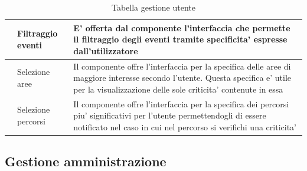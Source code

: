 \documentclass{article}
\begin{document}
\begin{table}[htbp]
\begin{tabularx}{\textwidth}{| l | l | X |}
        \hline
         & Filtraggio eventi & E' offerta dal componente l'interfaccia che permette il filtraggio degli eventi tramite specificita' espresse dall'utilizzatore \\
        \hline
         & Selezione aree & Il componente offre l'interfaccia per la specifica delle aree di maggiore interesse secondo l'utente. Questa specifica e' utile per la visualizzazione delle sole criticita' contenute in essa \\
        \hline
         & Selezione percorsi & Il componente offre l'interfaccia per la specifica dei percorsi piu' significativi per l'utente permettendogli di essere notificato nel caso in cui nel percorso si verifichi una criticita' \\
        \hline
    \end{tabularx}
    \caption{Tabella gestione utente}
\end{table}

\clearpage

\subsection{Gestione amministrazione}
\end{document}
